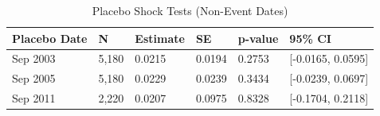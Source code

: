 \begin{table}[ht]
\centering
\begin{tabular}{llllll}
  \toprule
Placebo Date & N & Estimate & SE & p-value & 95\% CI \\ 
  \midrule
Sep 2003 & 5,180 & 0.0215 & 0.0194 & 0.2753 & [-0.0165, 0.0595] \\ 
  Sep 2005 & 5,180 & 0.0229 & 0.0239 & 0.3434 & [-0.0239, 0.0697] \\ 
  Sep 2011 & 2,220 & 0.0207 & 0.0975 & 0.8328 & [-0.1704, 0.2118] \\ 
   \bottomrule
\end{tabular}
\caption{Placebo Shock Tests (Non-Event Dates)} 
\label{tab:placebo_shocks}
\end{table}
